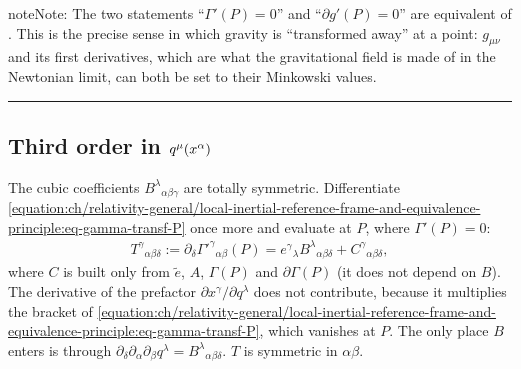 \documentclass[letterpaper,10pt,english]{jupyterBook}
\begin{document}
\begin{sphinxadmonition}{note}{Note:}
\sphinxAtStartPar
The two statements “\(\Gamma'(P)=0\)” and “\(\partial g'(P)=0\)” are equivalent  of . This is the precise sense in which gravity is “transformed away” at a point: \(g_{\mu\nu}\) and its first derivatives, which are what the gravitational field is made of in the Newtonian limit, can both be set to their Minkowski values.
\end{sphinxadmonition}




\bigskip\hrule\bigskip



\subsection{Third order in \protect\(q^{\mu}(x^\alpha)\protect\)}
\label{\detokenize{ch/relativity-general/local-inertial-reference-frame-and-equivalence-principle:third-order-in-q-mu-x-alpha}}
\sphinxAtStartPar
The cubic coefficients \(B^\lambda{}_{\alpha\beta\gamma}\) are totally symmetric. Differentiate \eqref{equation:ch/relativity-general/local-inertial-reference-frame-and-equivalence-principle:eq-gamma-transf-P} once more and evaluate at \(P\), where \(\Gamma'(P)=0\):
\begin{equation}\label{equation:ch/relativity-general/local-inertial-reference-frame-and-equivalence-principle:eq-T}
\begin{split}
T^\gamma{}_{\alpha\beta\delta}:=\partial_\delta\Gamma'^\gamma{}_{\alpha\beta}(P)=e^\gamma{}_\lambda B^\lambda{}_{\alpha\beta\delta}+C^\gamma{}_{\alpha\beta\delta},
\end{split}
\end{equation}
\sphinxAtStartPar
where \(C\) is built only from \(\tilde e\), \(A\), \(\Gamma(P)\) and \(\partial\Gamma(P)\) (it does not depend on \(B\)). The derivative of the prefactor \(\partial x^\gamma/\partial q^\lambda\) does not contribute, because it multiplies the bracket of \eqref{equation:ch/relativity-general/local-inertial-reference-frame-and-equivalence-principle:eq-gamma-transf-P}, which vanishes at \(P\). The only place \(B\) enters is through \(\partial_\delta\partial_\alpha\partial_\beta q^\lambda=B^\lambda{}_{\alpha\beta\delta}\). \(T\) is symmetric in \(\alpha\beta\).
\end{document}

